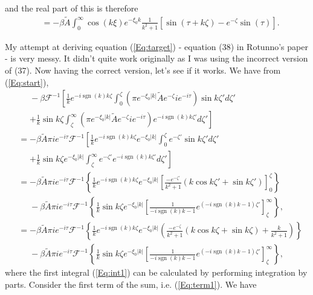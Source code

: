 \documentclass[12pt]{article}
\DeclareMathOperator{\sgn}{sgn}
\begin{document}
and the real part of this is therefore
\begin{align*}
& = -\beta \tilde{A} \int_{0}^{\infty} \cos\left(k\xi \right) e^{-\xi_0 k} \frac{1}{k^2+1} \left[\sin\left(\tau +k\zeta \right)-{e}^{-\zeta}\sin\left(\tau \right) \right].
\end{align*}

My attempt at deriving equation (\ref{Eq:target}) - equation (38) in Rotunno's paper - is very messy. It didn't quite work originally as I was using the incorrect version of (37). Now having the correct version, let's see if it works. We have from (\ref{Eq:start}),
\begin{align}
&\phantom{=} -\beta \mathcal{F}^{-1}\left[ \frac{1}{k} e^{-i\sgn(k) k \zeta} \int_0^\zeta \left(\pi e^{-\xi_0 |k|} \tilde{A} e^{-\zeta} i e^{-i\tau} \right) \sin k\zeta' d\zeta' \right. \\
& \phantom{=} \left. + \frac{1}{k} \sin k \zeta \int_\zeta^\infty \left(\pi e^{-\xi_0 |k|} \tilde{A} e^{-\zeta} i e^{-i\tau} \right) e^{-i\sgn(k)k\zeta'} d\zeta' \right] \\
& = -\beta \tilde{A} \pi i e^{-i\tau} \mathcal{F}^{-1} \left[ \frac{1}{k} e^{-i\sgn(k) k \zeta} e^{-\xi_0 |k|} \int_0^\zeta e^{-\zeta'} \sin k\zeta' d\zeta' \right. \\
& \phantom{=} \left.  + \frac{1}{k} \sin k \zeta e^{-\xi_0 |k|} \int_\zeta^\infty e^{-\zeta'} e^{-i\sgn(k)k\zeta'} d\zeta' \right]  \\
& =-\beta \tilde{A} \pi i e^{-i\tau} \mathcal{F}^{-1} \left\{ \frac{1}{k} e^{-i\sgn(k) k \zeta} e^{-\xi_0 |k|}   \left[ \frac{-e^{-\zeta'}}{k^2+1}\left(k\cos k\zeta' + \sin k\zeta' \right)\right]_0^\zeta \right\} \label{Eq:int1} \\
& \phantom{=} -\beta\tilde{A} \pi i e^{-i\tau} \mathcal{F}^{-1}\left\{\frac{1}{k} \sin k \zeta e^{-\xi_0 |k|} \left[ \frac{1}{-i\sgn(k)k-1}e^{\left(-i\sgn(k)k-1\right)\zeta'} \right]_\zeta^\infty \right\}, \\
& =-\beta \tilde{A} \pi i e^{-i\tau} \mathcal{F}^{-1} \left\{ \frac{1}{k} e^{-i\sgn(k) k \zeta} e^{-\xi_0 |k|}   \left( \frac{-e^{-\zeta}}{k^2+1}\left(k\cos k\zeta + \sin k\zeta \right) + \frac{k}{k^2+1} \right) \right\} \label{Eq:term1} \\
& \phantom{=} -\beta \tilde{A} \pi i e^{-i\tau} \mathcal{F}^{-1}\left\{ \frac{1}{k} \sin k \zeta e^{-\xi_0 |k|} \left[ \frac{1}{-i\sgn(k)k-1}e^{\left(-i\sgn(k)k-1\right)\zeta'} \right]_\zeta^\infty \right\},
\end{align}
where the first integral (\ref{Eq:int1}) can be calculated by performing integration by parts. Consider the first term of the sum, i.e. (\ref{Eq:term1}). We have
\end{document}
